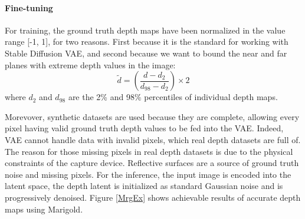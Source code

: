 \documentclass[12pt, letterpaper]{article}
\begin{document}
\begin{spacing}{1.15}
\paragraph{Fine-tuning}For training, the ground truth depth maps have been normalized in the value range [-1, 1], for two reasons. First because it is the standard for working with Stable Diffusion VAE, and second
because we want to bound the near and far planes with extreme depth values in the image:
\begin{equation}
    \tilde{d} = (\frac{d-d_2}{d_{98}-d_2})\times 2
\end{equation}
where \(d_2\) and \(d_{98}\) are the 2\% and 98\% percentiles of individual depth maps.

Morevover, synthetic datasets are used because they are complete, allowing every pixel having valid ground truth depth values to be fed into the VAE. Indeed, VAE cannot handle data with
invalid pixels, which real depth datasets are full of. The reason for those missing pixels in real depth datasets is due to the physical constraints of the capture device. Reflective
surfaces are a source of ground truth noise and missing pixels.
For the inference, the input image is encoded into the latent space, the depth latent is initialized as standard Gaussian noise and is progressively denoised. Figure \ref{MrgEx} shows achievable results of
accurate depth maps using Marigold.



\end{spacing}
\end{document}
